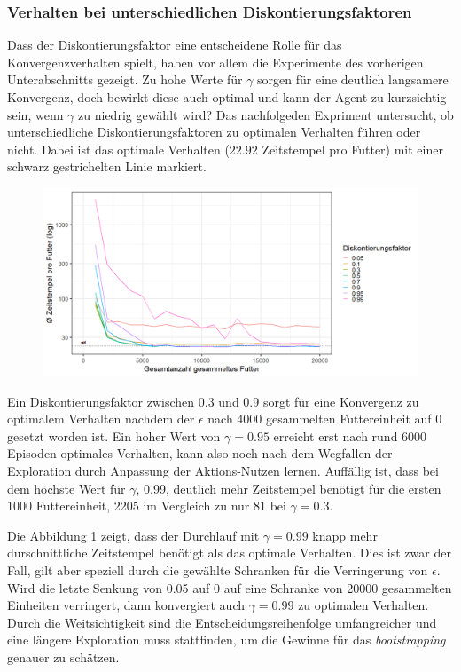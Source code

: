 \subsubsection*{Verhalten bei unterschiedlichen Diskontierungsfaktoren}
Dass der Diskontierungsfaktor eine entscheidene Rolle für das Konvergenzverhalten spielt, haben vor allem die Experimente des vorherigen Unterabschnitts gezeigt. Zu hohe Werte für $\gamma$ sorgen für eine deutlich langsamere Konvergenz, doch bewirkt diese auch optimal und kann der Agent zu \glqq kurzsichtig\grqq{} sein, wenn $\gamma$ zu niedrig gewählt wird? 
Das nachfolgeden Expriment untersucht, ob unterschiedliche Diskontierungsfaktoren zu optimalen Verhalten führen oder nicht. Dabei ist das optimale Verhalten ($22.92$ Zeitstempel pro Futter) mit einer schwarz gestrichelten Linie markiert.
\begin{figure}[H]
    \centering
    \includegraphics[width=\textwidth]{images/optDisc}
    \label{fig:optDisc}
\end{figure}
Ein Diskontierungsfaktor zwischen 0.3 und 0.9 sorgt für eine Konvergenz zu optimalem Verhalten nachdem der $\epsilon$ nach 4000 gesammelten Futtereinheit auf 0 gesetzt worden ist. Ein hoher Wert von $\gamma = 0.95$ erreicht erst nach rund 6000 Episoden optimales Verhalten, kann also noch nach dem Wegfallen der Exploration durch Anpassung der Aktions-Nutzen lernen. Auffällig ist, dass bei dem höchste Wert für $\gamma$, 0.99, deutlich mehr Zeitstempel benötigt für die ersten 1000 Futtereinheit, 2205 im Vergleich zu nur 81 bei $\gamma = 0.3$. 
\par 
Die Abbildung \ref{fig:optDisc} zeigt, dass der Durchlauf mit $\gamma = 0.99$ knapp mehr durschnittliche Zeitstempel benötigt als das optimale Verhalten. Dies ist zwar der Fall, gilt aber speziell durch die gewählte Schranken für die Verringerung von $\epsilon$. Wird die letzte Senkung von 0.05 auf 0 auf eine Schranke von 20000 gesammelten Einheiten verringert, dann konvergiert auch $\gamma = 0.99$ zu optimalen Verhalten. Durch die \glqq Weitsichtigkeit\grqq{} sind die Entscheidungsreihenfolge umfangreicher und eine längere Exploration muss stattfinden, um die Gewinne für das \textit{bootstrapping} genauer zu schätzen.

